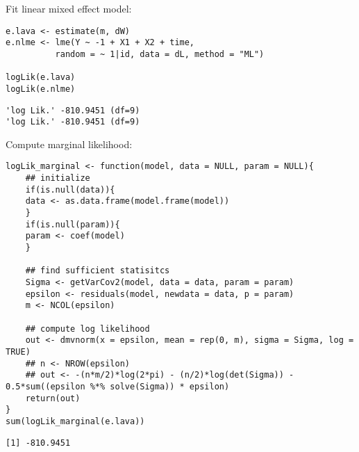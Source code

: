 \documentclass[12pt]{article}
\begin{document}
Fit linear mixed effect model:
\lstset{language=r,label= ,caption= ,captionpos=b,numbers=none}
\begin{lstlisting}
e.lava <- estimate(m, dW)
e.nlme <- lme(Y ~ -1 + X1 + X2 + time,
	      random = ~ 1|id, data = dL, method = "ML")

logLik(e.lava)
logLik(e.nlme)
\end{lstlisting}

\begin{verbatim}
'log Lik.' -810.9451 (df=9)
'log Lik.' -810.9451 (df=9)
\end{verbatim}

\clearpage

Compute marginal likelihood:
\lstset{language=r,label= ,caption= ,captionpos=b,numbers=none}
\begin{lstlisting}
logLik_marginal <- function(model, data = NULL, param = NULL){
    ## initialize
    if(is.null(data)){
	data <- as.data.frame(model.frame(model))
    }
    if(is.null(param)){
	param <- coef(model)
    }

    ## find sufficient statisitcs
    Sigma <- getVarCov2(model, data = data, param = param)
    epsilon <- residuals(model, newdata = data, p = param)
    m <- NCOL(epsilon)

    ## compute log likelihood
    out <- dmvnorm(x = epsilon, mean = rep(0, m), sigma = Sigma, log = TRUE)
    ## n <- NROW(epsilon)
    ## out <- -(n*m/2)*log(2*pi) - (n/2)*log(det(Sigma)) - 0.5*sum((epsilon %*% solve(Sigma)) * epsilon)
    return(out)
}
sum(logLik_marginal(e.lava))
\end{lstlisting}

\begin{verbatim}
[1] -810.9451
\end{verbatim}

\clearpage
\end{document}
